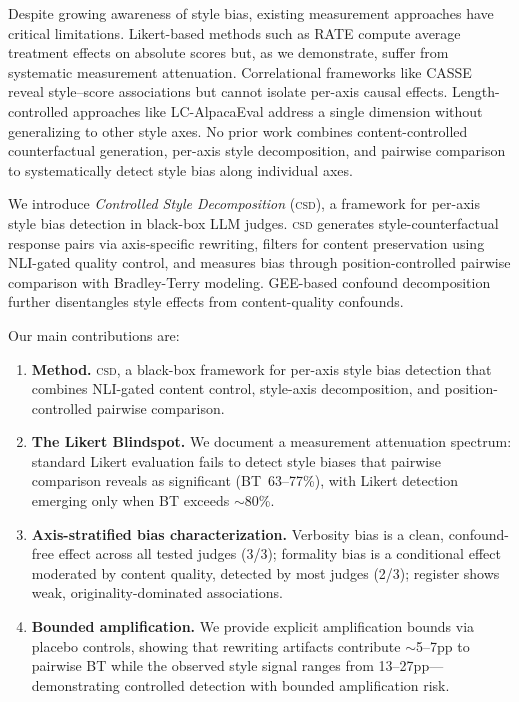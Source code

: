 \documentclass[11pt]{article}
\newcommand{\csd}{\textsc{csd}}
\begin{document}
Despite growing awareness of style bias, existing measurement approaches have critical limitations.
Likert-based methods such as RATE \cite{eisenstein2024rate} compute average treatment effects on absolute scores but, as we demonstrate, suffer from systematic measurement attenuation.
Correlational frameworks like CASSE \cite{zhou2025casse} reveal style--score associations but cannot isolate per-axis causal effects.
Length-controlled approaches like LC-AlpacaEval \cite{dubois2024length} address a single dimension without generalizing to other style axes.
No prior work combines content-controlled counterfactual generation, per-axis style decomposition, and pairwise comparison to systematically detect style bias along individual axes.

We introduce \emph{Controlled Style Decomposition} (\csd{}), a framework for per-axis style bias detection in black-box LLM judges.
\csd{} generates style-counterfactual response pairs via axis-specific rewriting, filters for content preservation using NLI-gated quality control, and measures bias through position-controlled pairwise comparison with Bradley-Terry modeling.
GEE-based confound decomposition further disentangles style effects from content-quality confounds.

Our main contributions are:
\begin{enumerate}
\item \textbf{Method.} \csd{}, a black-box framework for per-axis style bias detection that combines NLI-gated content control, style-axis decomposition, and position-controlled pairwise comparison.
\item \textbf{The Likert Blindspot.} We document a measurement attenuation spectrum: standard Likert evaluation fails to detect style biases that pairwise comparison reveals as significant (BT~63--77\%), with Likert detection emerging only when BT exceeds ${\sim}$80\%.
\item \textbf{Axis-stratified bias characterization.} Verbosity bias is a clean, confound-free effect across all tested judges (3/3); formality bias is a conditional effect moderated by content quality, detected by most judges (2/3); register shows weak, originality-dominated associations.
\item \textbf{Bounded amplification.} We provide explicit amplification bounds via placebo controls, showing that rewriting artifacts contribute ${\sim}$5--7pp to pairwise BT while the observed style signal ranges from 13--27pp---demonstrating controlled detection with bounded amplification risk.
\end{enumerate}
\end{document}
